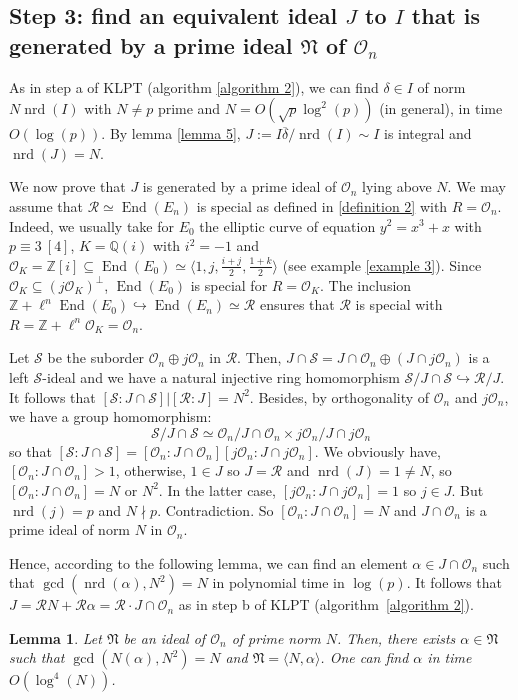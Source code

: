 \documentclass[a4paper,10pt]{report}
\theoremstyle{definition}
\theoremstyle{plain}
\newtheorem{lemma}[definition]{Lemma}
\theoremstyle{definition}
\newcommand{\Z}{\mathbb{Z}}
\newcommand{\Q}{\mathbb{Q}}
\newcommand{\m}[1]{\mathcal{#1}}
\newcommand{\mO}{\mathcal{O}}
\renewcommand{\(}{\left(}
\renewcommand{\)}{\right)}
\newcommand{\mf}[1]{\mathfrak{#1}}
\DeclareMathOperator{\End}{End}
\DeclareMathOperator{\nrd}{nrd}
\begin{document}
\subsection{Step 3: find an equivalent ideal $J$ to $I$ that is generated by a prime ideal $\mf{N}$ of $\mO_n$}

As in step a of KLPT (algorithm \ref{algorithm 2}), we can find $\delta\in I$ of norm $N\nrd(I)$ with $N\neq p$ prime and $N=O(\sqrt{p}\log^2(p))$ (in general), in time $O(\log(p))$. By lemma \ref{lemma 5}, $J:=I\overline{\delta}/\nrd(I)\sim I$ is integral and $\nrd(J)=N$.

We now prove that $J$ is generated by a prime ideal of $\mO_n$ lying above $N$. We may assume that $\m{R}\simeq\End(E_n)$ is special as defined in \ref{definition 2} with $R=\mO_n$. Indeed,  we usually take for $E_0$ the elliptic curve of equation $y^2=x^3+x$ with $p\equiv 3 \ [4]$, $K=\Q(i)$ with $i^2=-1$ and $\mO_K=\Z[i]\subseteq \End(E_0)\simeq \langle 1,j, \frac{i+j}{2},\frac{1+k}{2}\rangle$ (see example \ref{example 3}). Since $\mO_K\subseteq (j\mO_K)^\bot$, $\End(E_0)$ is special for $R=\mO_K$. The inclusion $\Z+\ell^n\End(E_0)\hookrightarrow \End(E_n)\simeq \m{R}$ ensures that $\m{R}$ is special with $R=\Z+\ell^n\mO_K=\mO_n$.

Let $\m{S}$ be the suborder $\mO_n\oplus j\mO_n$ in $\m{R}$. Then, $J\cap\m{S}=J\cap\mO_n\oplus(J\cap j\mO_n)$ is a left $\m{S}$-ideal and we have a natural injective ring homomorphism $\m{S}/J\cap\m{S}\hookrightarrow \m{R}/J$. It follows that $[\m{S}:J\cap\m{S}]|[\m{R}:J]=N^2$. Besides, by orthogonality of $\mO_n$ and $j\mO_n$, we have a group homomorphism: 
\[\m{S}/J\cap\m{S}\simeq \mO_n/J\cap\mO_n\times j\mO_n/J\cap j\mO_n\]
so that $[\m{S}:J\cap\m{S}]=[\mO_n:J\cap\mO_n][j\mO_n:J\cap j\mO_n]$. We obviously have, $[\mO_n:J\cap\mO_n]>1$, otherwise, $1\in J$ so $J=\m{R}$ and $\nrd(J)=1\neq N$, so $[\mO_n:J\cap\mO_n]=N$ or $N^2$. In the latter case, $[j\mO_n:J\cap j\mO_n]=1$ so $j\in J$. But $\nrd(j)=p$ and $N\nmid p$. Contradiction.  So $[\mO_n:J\cap\mO_n]=N$ and $J\cap\mO_n$ is a prime ideal of norm $N$ in $\mO_n$.

Hence, according to the following lemma, we can find an element $\alpha\in J\cap \mO_n$ such that $\gcd(\nrd(\alpha),N^2)=N$ in polynomial time in $\log(p)$.  It follows that $J=\m{R}N+\m{R}\alpha=\m{R}\cdot J\cap\mO_n$ as in step b of KLPT (algorithm~\ref{algorithm 2}).

\begin{lemma}
Let $\mf{N}$ be an ideal of $\mO_n$ of prime norm $N$. Then, there exists $\alpha\in \mf{N}$ such that $\gcd(N(\alpha),N^2)=N$ and $\mf{N}=\langle N,\alpha\rangle$. One can find $\alpha$ in time $O(\log^4(N))$.
\end{lemma}
\end{document}
